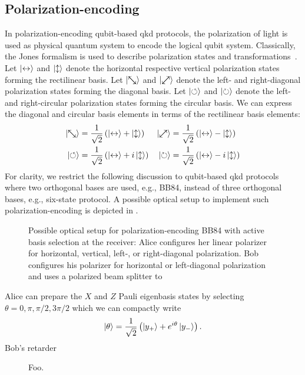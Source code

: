 \FloatBarrier
\subsection{Polarization-encoding}

In polarization-encoding qubit-based \gls{qkd} protocols, the polarization of light is used as physical quantum system to encode the logical qubit system.
Classically, the Jones formalism is used to describe polarization states and transformations~\cite[p.~199]{Saleh2007}.
Let $\ket{\leftrightarrow}$ and $\ket{\updownarrow}$ denote the horizontal respective vertical polarization states forming the rectilinear basis.
Let $\ket{\nwsearrow}$ and $\ket{\neswarrow}$ denote the left- and right-diagonal polarization states forming the diagonal basis.
Let $\ket{\circlearrowleft}$ and $\ket{\circlearrowright}$ denote the left- and right-circular polarization states forming the circular basis.
We can express the diagonal and circular basis elements in terms of the rectilinear basis elements:
\begin{align}
	\ket{\nwsearrow}
	&=
	\frac{1}{\sqrt{2}}
	\left(
		\ket{\leftrightarrow}
		+
		\ket{\updownarrow}
	\right)
	&
	\ket{\neswarrow}
	&=
	\frac{1}{\sqrt{2}}
	\left(
		\ket{\leftrightarrow}
		-
		\ket{\updownarrow}
	\right)
	\\
	\ket{\circlearrowleft}
	&=
	\frac{1}{\sqrt{2}}
	\left(
		\ket{\leftrightarrow}
		+
		i\ket{\updownarrow}
	\right)
	&
	\ket{\circlearrowright}
	&=
	\frac{1}{\sqrt{2}}
	\left(
		\ket{\leftrightarrow}
		-
		i\ket{\updownarrow}
	\right)
\end{align}
For clarity, we restrict the following discussion to qubit-based \gls{qkd} protocols where two orthogonal bases are used, e.g., BB84, instead of three orthogonal bases, e.g., six-state protocol.
A possible optical setup to implement such polarization-encoding is depicted in .
\begin{figure}[htb]
	\centering
	
	\caption{Possible optical setup for polarization-encoding BB84 with active basis selection at the receiver: Alice configures her linear polarizer for horizontal, vertical, left-, or right-diagonal polarization. Bob configures his polarizer for horizontal or left-diagonal polarization and uses a polarized beam splitter to }\label{fig:polarization_encoding_active}
\end{figure}
Alice can prepare the $X$ and $Z$ Pauli eigenbasis states by selecting $\theta=0,\pi,\pi/2,3\pi/2$ which we can compactly write
\begin{equation}
	\ket{\theta}
	=
	\frac{1}{\sqrt{2}}
	\left(
		\ket{y_+}
		+
		e^{i\theta}
		\ket{y_-}
	\right)
	.
\end{equation}
Bob's retarder 
\begin{figure}[htb]
	\centering
	
	\caption{Foo.}
\end{figure}

